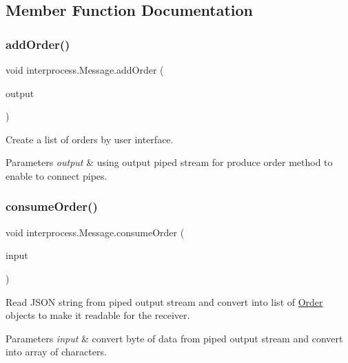 \subsection{Member Function Documentation}
\mbox{\label{classinterprocess_1_1_message_a66e94ca490a4bae0e26db95052aa3956}} 
\subsubsection{\texorpdfstring{add\+Order()}{addOrder()}}
{\footnotesize\ttfamily void interprocess.\+Message.\+add\+Order (\begin{DoxyParamCaption}\item[{Piped\+Output\+Stream}]{output }\end{DoxyParamCaption})\hspace{0.3cm}{\ttfamily [inline]}}

Create a list of orders by user interface. 
\begin{DoxyParams}{Parameters}
{\em output} & using output piped stream for produce order method to enable to connect pipes. \\
\hline
\end{DoxyParams}
\mbox{\label{classinterprocess_1_1_message_ada4c768cf0688deaede00d43220fd100}} 
\subsubsection{\texorpdfstring{consume\+Order()}{consumeOrder()}}
{\footnotesize\ttfamily void interprocess.\+Message.\+consume\+Order (\begin{DoxyParamCaption}\item[{Piped\+Input\+Stream}]{input }\end{DoxyParamCaption})\hspace{0.3cm}{\ttfamily [inline]}}

Read J\+S\+ON string from piped output stream and convert into list of \hyperlink{classinterprocess_1_1_order}{Order} objects to make it readable for the receiver. 
\begin{DoxyParams}{Parameters}
{\em input} & convert byte of data from piped output stream and convert into array of characters. \\
\hline
\end{DoxyParams}

